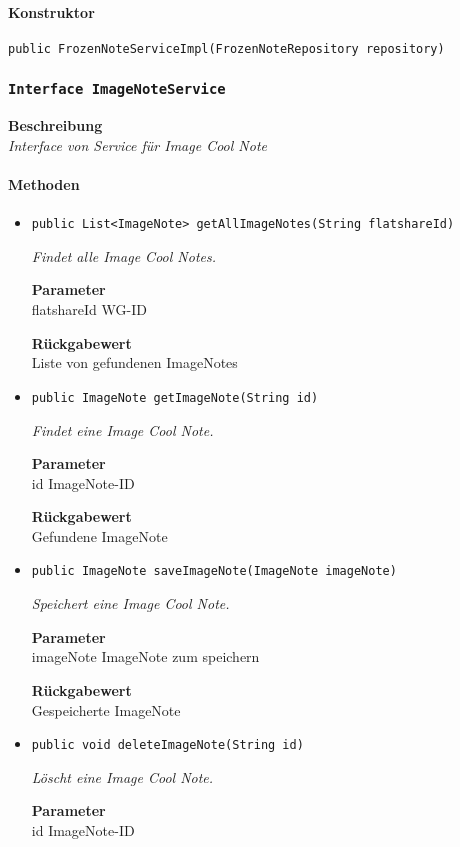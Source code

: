     \paragraph*{Konstruktor}
    \texttt{public FrozenNoteServiceImpl(FrozenNoteRepository repository)}
    \subsubsection{\texttt{Interface ImageNoteService}}
    \textbf{Beschreibung} \\
    \textit{Interface von Service für Image Cool Note}
    \paragraph*{Methoden}
    \begin{itemize}
    	\item{\texttt{public List<ImageNote> getAllImageNotes(String flatshareId)}}
    	
    	\textit{Findet alle Image Cool Notes.}
    	
    	\textbf{Parameter} \\
    	flatshareId WG-ID
    	
    	\textbf{Rückgabewert} \\
    	Liste von gefundenen ImageNotes        \item{\texttt{public ImageNote getImageNote(String id)}}
    	
    	\textit{Findet eine Image Cool Note.}
    	
    	\textbf{Parameter} \\
    	id ImageNote-ID
    	
    	\textbf{Rückgabewert} \\
    	Gefundene ImageNote        \item{\texttt{public ImageNote saveImageNote(ImageNote imageNote)}}
    	
    	\textit{Speichert eine Image Cool Note.}
    	
    	\textbf{Parameter} \\
    	imageNote ImageNote zum speichern
    	
    	\textbf{Rückgabewert} \\
    	Gespeicherte ImageNote        \item{\texttt{public void deleteImageNote(String id)}}
    	
    	\textit{Löscht eine Image Cool Note.}
    	
    	\textbf{Parameter} \\
    	id ImageNote-ID
    	
    	
    \end{itemize}
